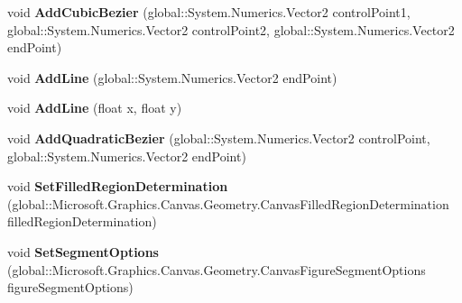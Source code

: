 \begin{DoxyCompactItemize}
void {\bfseries Add\+Cubic\+Bezier} (global\+::\+System.\+Numerics.\+Vector2 control\+Point1, global\+::\+System.\+Numerics.\+Vector2 control\+Point2, global\+::\+System.\+Numerics.\+Vector2 end\+Point)
\item 
\mbox{\label{interface_microsoft_1_1_graphics_1_1_canvas_1_1_geometry_1_1_i_canvas_path_builder_aec02c6cfb6989a2cbee2696238ec24fd}} 
void {\bfseries Add\+Line} (global\+::\+System.\+Numerics.\+Vector2 end\+Point)
\item 
\mbox{\label{interface_microsoft_1_1_graphics_1_1_canvas_1_1_geometry_1_1_i_canvas_path_builder_a2758a748e2439c467f7522f7a9b134b8}} 
void {\bfseries Add\+Line} (float x, float y)
\item 
\mbox{\label{interface_microsoft_1_1_graphics_1_1_canvas_1_1_geometry_1_1_i_canvas_path_builder_ac8de702afe0be29d6775abc66e63ac50}} 
void {\bfseries Add\+Quadratic\+Bezier} (global\+::\+System.\+Numerics.\+Vector2 control\+Point, global\+::\+System.\+Numerics.\+Vector2 end\+Point)
\item 
\mbox{\label{interface_microsoft_1_1_graphics_1_1_canvas_1_1_geometry_1_1_i_canvas_path_builder_acc584830d3f1748c8144e3800c457004}} 
void {\bfseries Set\+Filled\+Region\+Determination} (global\+::\+Microsoft.\+Graphics.\+Canvas.\+Geometry.\+Canvas\+Filled\+Region\+Determination filled\+Region\+Determination)
\item 
\mbox{\label{interface_microsoft_1_1_graphics_1_1_canvas_1_1_geometry_1_1_i_canvas_path_builder_af370ca945a2f94ff7cc968d77512fd8d}} 
void {\bfseries Set\+Segment\+Options} (global\+::\+Microsoft.\+Graphics.\+Canvas.\+Geometry.\+Canvas\+Figure\+Segment\+Options figure\+Segment\+Options)
\item 
\mbox{\label{interface_microsoft_1_1_graphics_1_1_canvas_1_1_geometry_1_1_i_canvas_path_builder_a9ce31a3bed6a5118d4e16140a1c21484}} 

\end{DoxyCompactItemize}
